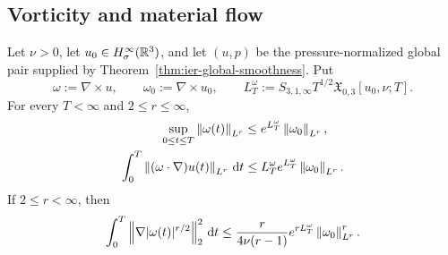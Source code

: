 \subsection{Vorticity and material flow}

\begin{theorem}
\label{thm:app-vorticity-amplification}
Let \(\nu>0\), let \(u_0\in H^\infty_\sigma(\mathbb R^3)\), and let \((u,p)\) be the
pressure-normalized global pair supplied by
Theorem~\ref{thm:ier-global-smoothness}.  Put
\[
 \omega:=\nabla\times u,
 \qquad
 \omega_0:=\nabla\times u_0,
 \qquad
 L_T^\omega:=S_{3,1,\infty}T^{1/2}
 \mathfrak X_{0,3}[u_0,\nu;T].
\]
For every \(T<\infty\) and \(2\le r\le\infty\),
\begin{align}
 \sup_{0\le t\le T}\left\lVert \omega(t)\right\rVert_{L^r}
 &\le e^{L_T^\omega}\left\lVert \omega_0\right\rVert_{L^r},
 \label{eq:app-vorticity-Lr-amplification}\\
 \int_0^T\left\lVert (\omega\cdot\nabla)u(t)\right\rVert_{L^r}\,\mathrm d t
 &\le L_T^\omega e^{L_T^\omega}\left\lVert \omega_0\right\rVert_{L^r}.
 \label{eq:app-vortex-stretching-action}
\end{align}
If \(2\le r<\infty\), then
\begin{equation}
 \int_0^T\left\lVert \nabla|\omega(t)|^{r/2}\right\rVert_2^2\,\mathrm d t
 \le \frac{r}{4\nu(r-1)}e^{rL_T^\omega}
       \left\lVert \omega_0\right\rVert_{L^r}^r.
 \label{eq:app-vorticity-dissipation}
\end{equation}
\end{theorem}

